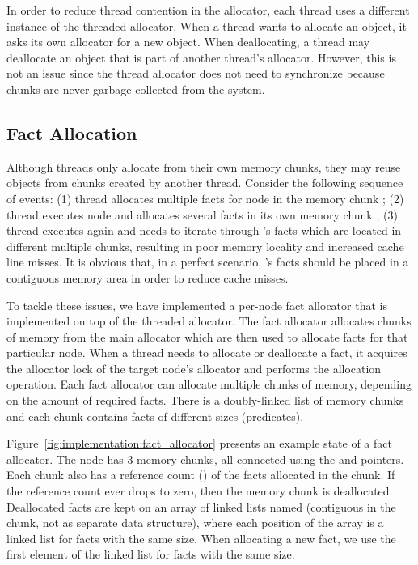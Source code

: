 In order to reduce thread contention in the allocator, each thread uses a
different instance of the threaded allocator. When a thread wants to allocate an
object, it asks its own allocator for a new object. When deallocating, a thread
may deallocate an object that is part of another thread's allocator. However,
this is not an issue since the thread allocator does not need to synchronize
because chunks are never garbage collected from the system.

\iffalse
\subsection{Fact Allocation}

Although threads only allocate from their own memory chunks, they may reuse
objects from chunks created by another thread. Consider the following sequence
of events: (1) thread  allocates multiple facts for node  in
the memory chunk ; (2) thread  executes node  and
allocates several facts in its own memory chunk ; (3) thread 
executes  again and needs to iterate through 's facts which are
located in different multiple chunks, resulting in poor memory locality and
increased cache line misses. It is obvious that, in a perfect scenario,
's facts should be placed in a contiguous memory area in order to reduce
cache misses.

To tackle these issues, we have implemented a per-node fact allocator that is
implemented on top of the threaded allocator. The fact allocator allocates
chunks of memory from the main allocator which are then used to allocate facts
for that particular node. When a thread needs to allocate or deallocate a fact,
it acquires the allocator lock of the target node's allocator and performs the
allocation operation. Each fact allocator can allocate multiple chunks of
memory, depending on the amount of required facts. There is a doubly-linked list
of memory chunks and each chunk contains facts of different sizes (predicates).

Figure~\ref{fig:implementation:fact_allocator} presents an example state of a
fact allocator. The node has 3 memory chunks, all connected using the
 and  pointers. Each chunk also has a reference count
() of the facts allocated in the chunk. If the reference count
ever drops to zero, then the memory chunk is deallocated. Deallocated facts are
kept on an array of linked lists named  (contiguous in the
chunk, not as separate data structure), where each position of the array is a
linked list for facts with the same size. When allocating a new fact, we use the
first element of the linked list for facts with the same size.

